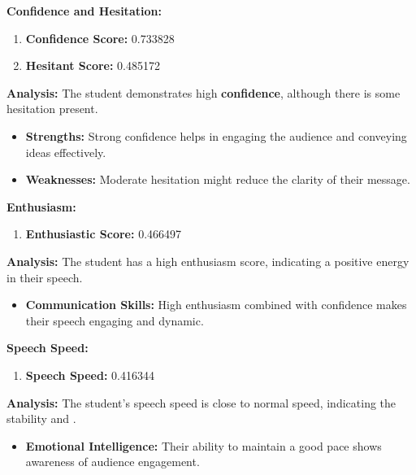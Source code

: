 \documentclass{article}
\begin{document}
    \large{\textbf{Confidence and Hesitation:}}
    \begin{tcolorbox}[colback=green!10!white, colframe=green!80!black, title=Confidence and Hesitant Scores]
        \begin{enumerate}
            \item \textbf{Confidence Score:} \textcolor{green!50!black}{0.733828}
            \item \textbf{Hesitant Score:} \textcolor{red!70!black}{0.485172}
        \end{enumerate}
        \textbf{Analysis:} The student demonstrates high \textbf{confidence}, although there is some hesitation present.
        \begin{itemize}
            \item \textbf{Strengths:} Strong confidence helps in engaging the audience and conveying ideas effectively.
            \item \textbf{Weaknesses:} Moderate hesitation might reduce the clarity of their message.
        \end{itemize}
    \end{tcolorbox}

    \large{\textbf{Enthusiasm:}}
    \begin{tcolorbox}[colback=orange!10!white, colframe=orange!80!black, title=Enthusiastic Score]
        \begin{enumerate}
            \item \textbf{Enthusiastic Score:} \textcolor{orange!70!black}{0.466497}
        \end{enumerate}
        \textbf{Analysis:} The student has a high enthusiasm score, indicating a positive energy in their speech.
        \begin{itemize}
            \item \textbf{Communication Skills:} High enthusiasm combined with confidence makes their speech engaging and dynamic.
        \end{itemize}
    \end{tcolorbox}

    \large{\textbf{Speech Speed:}}
    \begin{tcolorbox}[colback=purple!10!white, colframe=purple!80!black, title=Speech Speed]
        \begin{enumerate}
            \item \textbf{Speech Speed:} \textcolor{purple!70!black}{0.416344}
        \end{enumerate}
        \textbf{Analysis:} The student's speech speed is close to normal speed, indicating the stability and .
        \begin{itemize}
            \item \textbf{Emotional Intelligence:} Their ability to maintain a good pace shows awareness of audience engagement.
        \end{itemize}
    \end{tcolorbox}
\end{document}
